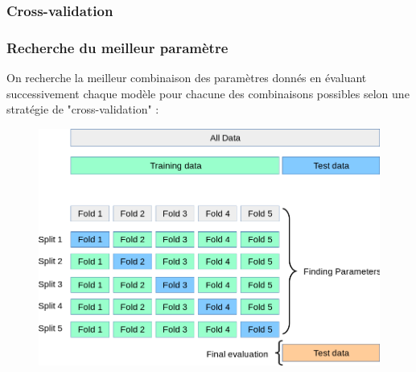 \documentclass{beamer}
\begin{document}
\subsubsection{Cross-validation}
\begin{frame}
	\frametitle{Recherche du meilleur paramètre}
	On recherche la meilleur combinaison des paramètres donnés en évaluant successivement chaque modèle pour chacune des combinaisons possibles selon une stratégie de "cross-validation" :
	\begin{figure}[b]
		\centering
		\includegraphics[scale=0.2]{gscv}
	\end{figure}
\end{frame}
\end{document}

